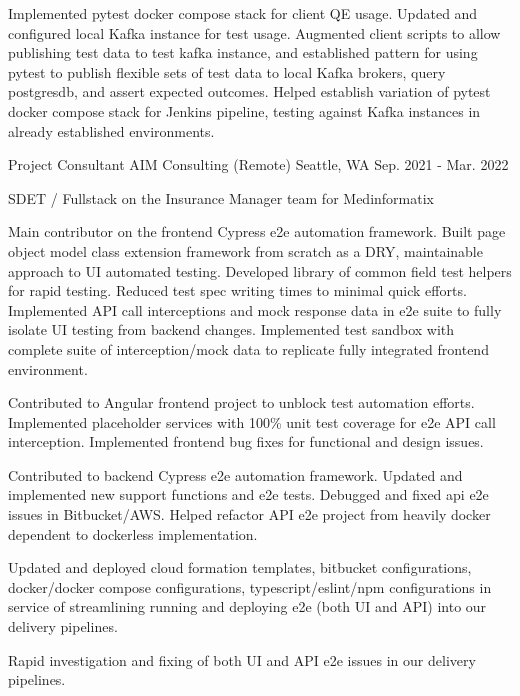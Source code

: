 \begin{cventries}
{\begin{cvitems}
\item {Implemented pytest docker compose stack for client QE usage. Updated and configured local Kafka instance for test usage. Augmented client scripts to allow publishing test data to test kafka instance, and established pattern for using pytest to publish flexible sets of test data to local Kafka brokers, query postgresdb, and assert expected outcomes. Helped establish variation of pytest docker compose stack for Jenkins pipeline, testing against Kafka instances in already established environments.}
\end{cvitems}
}

\cventry
{Project Consultant} %
{AIM Consulting (Remote)} %
{Seattle, WA} %
{Sep. 2021 - Mar. 2022} %
{
\begin{cvitems}
\item[] {SDET / Fullstack on the Insurance Manager team for Medinformatix}
\item[]
\item {Main contributor on the frontend Cypress e2e automation framework. Built page object model class extension framework from scratch as a DRY, maintainable approach to UI automated testing. Developed library of common field test helpers for rapid testing. Reduced test spec writing times to minimal quick efforts. Implemented API call interceptions and mock response data in e2e suite to fully isolate UI testing from backend changes. Implemented test sandbox with complete suite of interception/mock data to replicate fully integrated frontend environment.}
\item {Contributed to Angular frontend project to unblock test automation efforts. Implemented placeholder services with 100\% unit test coverage for e2e API call interception. Implemented frontend bug fixes for functional and design issues.}
\item {Contributed to backend Cypress e2e automation framework. Updated and implemented new support functions and e2e tests. Debugged and fixed api e2e issues in Bitbucket/AWS. Helped refactor API e2e project from heavily docker dependent to dockerless implementation.}
\item {Updated and deployed cloud formation templates, bitbucket configurations, docker/docker compose configurations, typescript/eslint/npm configurations in service of streamlining running and deploying e2e (both UI and API) into our delivery pipelines.}
\item {Rapid investigation and fixing of both UI and API e2e issues in our delivery pipelines.}

\end{cvitems}}
\end{cventries}
